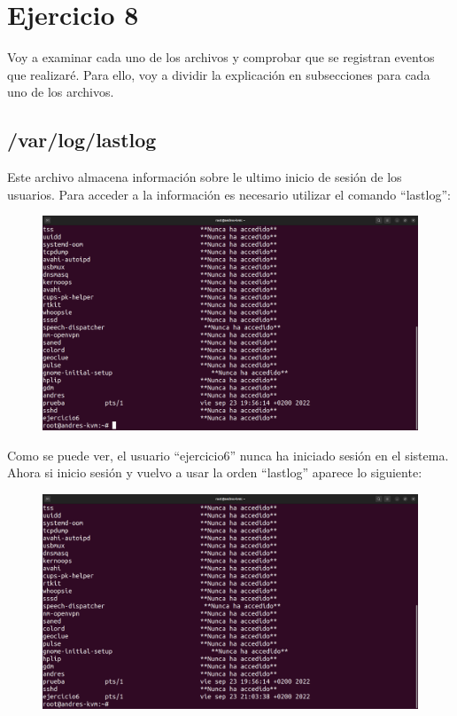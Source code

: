 \documentclass{article}
\begin{document}
\section*{Ejercicio 8}
Voy a examinar cada uno de los archivos y comprobar que se registran eventos que realizaré. Para ello, voy a dividir la explicación en subsecciones para cada uno de los archivos.

\subsection*{/var/log/lastlog}
Este archivo almacena información sobre le ultimo inicio de sesión de los usuarios. Para acceder a la información es necesario utilizar el comando ``lastlog'':

\begin{figure}[H]
    \includegraphics[width=\textwidth]{imagenes/lastlogejercicio6never.png}
\end{figure}

Como se puede ver, el usuario ``ejercicio6'' nunca ha iniciado sesión en el sistema. Ahora si inicio sesión y vuelvo a usar la orden ``lastlog'' aparece lo siguiente:

\begin{figure}[H]
    \includegraphics[width=\textwidth]{imagenes/lastlogejercicio6ok.png}
\end{figure}
\end{document}

